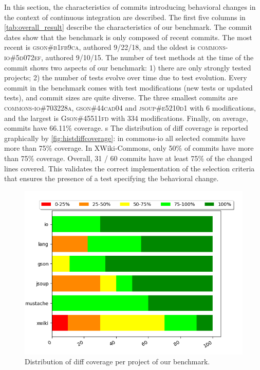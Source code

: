 In  this section, the characteristics of commits introducing behavioral changes in the context of continuous integration are described.
The first five columns in \autoref{tab:overall_result} describe the characteristics of our benchmark.
The commit dates show that the benchmark is only composed of recent commits.
The most recent is \textsc{gson\#b1fb9ca}, authored 9/22/18, and the oldest is \textsc{commons-io\#5d072ef}, authored 9/10/15.
The number of test methods at the time of the commit shows two aspects of our benchmark:
1) there are only strongly tested projects;
2) the number of tests evolve over time due to test evolution.
Every commit in the benchmark comes with test modifications (new tests or updated tests), and commit sizes are quite diverse.
The three smallest commits are \textsc{commons-io\#703228a}, \textsc{gson\#44cad04} and \textsc{jsoup\#e5210d1} with 6 modifications, and the largest is \textsc{Gson\#45511fd} with 334 modifications.
%
Finally, on average, commits have 66.11\% coverage. s
The distribution of diff coverage is reported graphically by \autoref{fig:histdiffcoverage}: 
in commons-io all selected commits have more than 75\% coverage.
In XWiki-Commons, only 50\% of commits have more than 75\% coverage. 
Overall, 31 / 60 commits have at least 75\% of the changed lines covered.
This validates the correct implementation of the selection criteria that ensures the presence of a test specifying the behavioral change.

\begin{figure}
\centering
\includegraphics[width=.95\linewidth]{img/diff_cov_hist.png}
\caption{Distribution of diff coverage per project of our benchmark.}
\label{fig:histdiffcoverage}
\end{figure}

